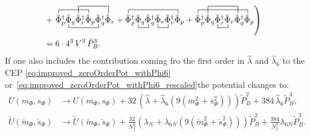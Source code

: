 \begin{align}
        \nonumber \\ 
           & +\left. \contraction{}{ \tilde\Phi }{ {}_{p}^{\dagger} \tilde\Phi_{q} \tilde\Phi_{r}^{\dagger} }{ \tilde \Phi}
                     \bcontraction{ \tilde\Phi_{p}^{\dagger} }{ \tilde\Phi }{ {}_{q} \tilde\Phi_{r}^{\dagger} \tilde\Phi_{p} }{ \tilde\Phi }
                     \contraction[2ex]{ \tilde\Phi_{p}^{\dagger} \tilde\Phi_{q} }{ \tilde\Phi }{ {}_{r}^{\dagger} \tilde\Phi_{p} \tilde\Phi_{q}^{\dagger} }{ \tilde\Phi} 
                     \tilde\Phi_{p}^{\dagger} \tilde\Phi_{q} \tilde\Phi_{r}^{\dagger} \tilde\Phi_{p} \tilde\Phi_{q}^{\dagger} \tilde\Phi_{r}
                   + \contraction{}{ \tilde\Phi }{ {}_{p}^{\dagger} \tilde\Phi_{q} \tilde\Phi_{q}^{\dagger} \tilde\Phi_{r} \tilde\Phi_{r}^{\dagger} }{ \tilde\Phi}
                     \bcontraction{ \tilde\Phi_{p}^{\dagger} }{ \tilde\Phi }{ {}_{q} }{ \tilde\Phi }
                     \bcontraction{ \tilde\Phi_{p}^{\dagger} \tilde\Phi_{q} \tilde\Phi_{q}^{\dagger} }{ \tilde\Phi }{ {}_{r} }{ \tilde\Phi}
                     \tilde\Phi_{p}^{\dagger} \tilde\Phi_{q} \tilde\Phi_{q}^{\dagger} \tilde\Phi_{r} \tilde\Phi_{r}^{\dagger} \tilde\Phi_{p}
                   + \contraction{}{ \tilde\Phi }{ {}_{p}^{\dagger} \tilde\Phi_{q} \tilde\Phi_{r}^{\dagger} \tilde\Phi_{r} \tilde\Phi_{q}^{\dagger} }{ \tilde \Phi }
                     \contraction[2ex]{ \tilde\Phi_{p}^{\dagger} }{ \tilde\Phi }{ {}_{q} \tilde\Phi_{r}^{\dagger} \tilde\Phi_{r} }{\tilde \Phi}
                     \bcontraction{ \tilde\Phi_{p}^{\dagger} \tilde\Phi_{q} }{ \tilde\Phi }{ {}_{r}^{\dagger} }{ \tilde\Phi }
                     \tilde\Phi_{p}^{\dagger} \tilde\Phi_{q} \tilde\Phi_{r}^{\dagger} \tilde\Phi_{r} \tilde\Phi_{q}^{\dagger} \tilde\Phi_{p}
                     \right)
        \nonumber \\
                 & = 6\cdot4^3\, V^3\, \tilde P_B^3.
\end{align}
If one also includes the contribution coming fro the first order in $\hat\lambda$ and $\hat\lambda_6$ to the CEP \eqref{eq:improved_zeroOrderPot_withPhi6} 
or~\eqref{eq:improved_zeroOrderPot_withPhi6_rescaled}the potential
changes to:
\begin{align}\label{eq:CEP_oneLoopAddition_withDetAndLambda6}
 U(m_{\Phi}, s_{\Phi}) & \rightarrow U(m_{\Phi}, s_{\Phi}) + 32\,\left(\hat \lambda + \hat\lambda_6\left( 9\left( m_{\Phi}^2 + s_{\Phi}^2 \right) \right) \right) \tilde P_B^2
                        + 384\, \hat\lambda_6 \tilde P_B^3,
      \\ \label{eq:CEP_oneLoopAddition_withDetAndLambda6_rescaled}
 \tilde U(\breve{m}_{\Phi},\breve{s}_{\Phi}) & \rightarrow  
       \tilde U(\breve{m}_{\Phi},\breve{s}_{\Phi}) + 
                        \frac{32}{N_f^2} \left( \lambda_N + \lambda_{6N} \left( 9\left( \breve{m}_{\Phi}^2 + \breve{s}_{\Phi}^2 \right) \right) \right) \tilde P_B^2
                        + \frac{384}{N_f^3} \lambda_{6N} \tilde P_B^3.
\end{align}
